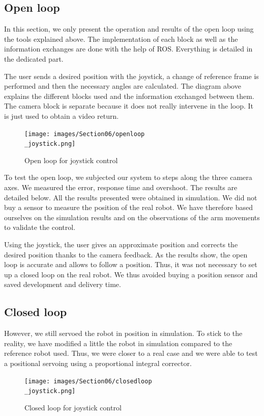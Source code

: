 \subsection{Open loop}

\hspace{\parindent} In this section, we only present the operation and results of the open loop using the tools explained above. The implementation of each block as well as the information exchanges are done with the help of ROS. Everything is detailed in the dedicated part.

\bigbreak
The user sends a desired position with the joystick, a change of reference frame is performed and then the necessary angles are calculated. The diagram above explains the different blocks used and the information exchanged between them. The camera block is separate because it does not really intervene in the loop. It is just used to obtain a video return.
\begin{figure}[ht]
    \centering
    \texttt{[image: images/Section06/openloop\\\_joystick.png]}
    \caption{Open loop for joystick control}
    \label{fig:mesh19}
\end{figure}
\FloatBarrier

\bigbreak 
To test the open loop, we subjected our system to steps along the three camera axes. We measured the error, response time and overshoot. The results are detailed below. All the results presented were obtained in simulation. We did not buy a sensor to measure the position of the real robot. We have therefore based ourselves on the simulation results and on the observations of the arm movements to validate the control.

\bigbreak
Using the joystick, the user gives an approximate position and corrects the desired position thanks to the camera feedback. As the results show, the open loop is accurate and allows to follow a position. Thus, it was not necessary to set up a closed loop on the real robot. We thus avoided buying a position sensor and saved development and delivery time.

\subsection{Closed loop}


\hspace{\parindent} However, we still servoed the robot in position in simulation. To stick to the reality, we have modified a little the robot in simulation compared to the reference robot used. Thus, we were closer to a real case and we were able to test a positional servoing using a proportional integral corrector.

\begin{figure}[ht]
    \centering
    \texttt{[image: images/Section06/closedloop\\\_joystick.png]}
    \caption{Closed loop for joystick control}
    \label{fig:mesh20}
\end{figure}
\FloatBarrier